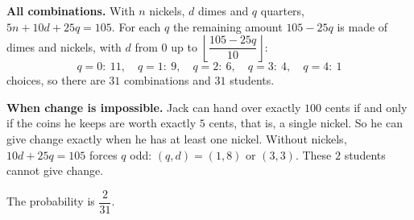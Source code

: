 \textbf{All combinations.} With $n$ nickels, $d$ dimes and $q$ quarters, $5n+10d+25q=105$. For each $q$ the remaining amount $105-25q$ is made of dimes and nickels, with $d$ from $0$ up to $\left\lfloor\dfrac{105-25q}{10}\right\rfloor$:
\[
q=0:\ 11,\quad q=1:\ 9,\quad q=2:\ 6,\quad q=3:\ 4,\quad q=4:\ 1
\]
choices, so there are $31$ combinations and $31$ students.

\textbf{When change is impossible.} Jack can hand over exactly $100$ cents if and only if the coins he keeps are worth exactly $5$ cents, that is, a single nickel. So he can give change exactly when he has at least one nickel. Without nickels, $10d+25q=105$ forces $q$ odd: $(q,d)=(1,8)$ or $(3,3)$. These $2$ students cannot give change.

The probability is $\boxed{\dfrac{2}{31}}$.
